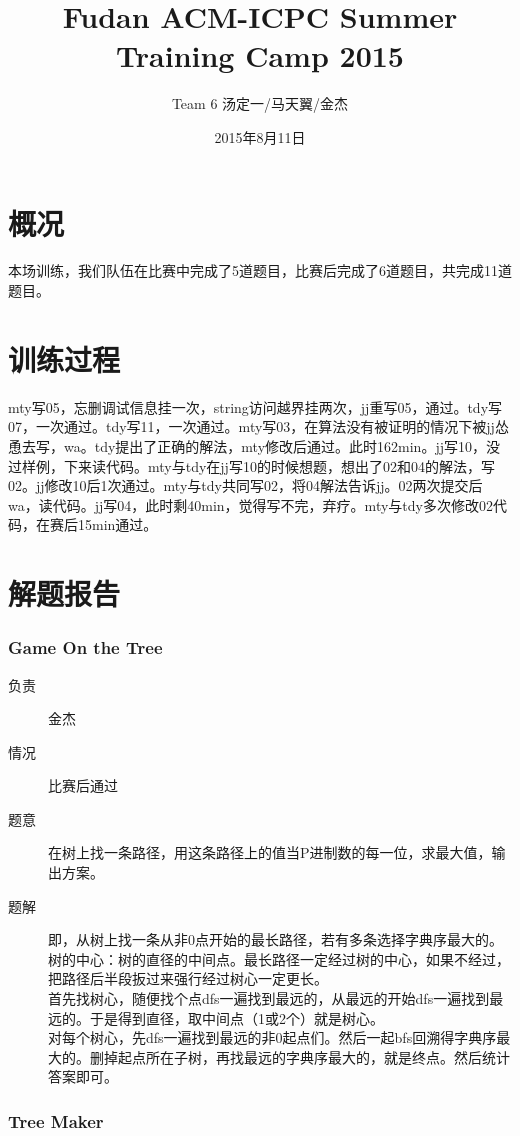 \documentclass[a4paper, 11pt, nofonts, nocap, fancyhdr]{ctexart}
\title{Fudan ACM-ICPC Summer Training Camp 2015}
\author{Team 6 汤定一/马天翼/金杰}
\date{2015年8月11日}
\newcommand{\problem}[1]{\subsubsection{#1}}
\begin{document}
\maketitle

\section{概况}

本场训练，我们队伍在比赛中完成了5道题目，比赛后完成了6道题目，共完成11道题目。

\section{训练过程}

mty写05，忘删调试信息挂一次，string访问越界挂两次，jj重写05，通过。tdy写07，一次通过。tdy写11，一次通过。mty写03，在算法没有被证明的情况下被jj怂恿去写，wa。tdy提出了正确的解法，mty修改后通过。此时162min。jj写10，没过样例，下来读代码。mty与tdy在jj写10的时候想题，想出了02和04的解法，写02。jj修改10后1次通过。mty与tdy共同写02，将04解法告诉jj。02两次提交后wa，读代码。jj写04，此时剩40min，觉得写不完，弃疗。mty与tdy多次修改02代码，在赛后15min通过。

\section{解题报告}

\problem{Game On the Tree}

\begin{description}
\item[负责] 金杰
\item[情况] 比赛后通过
\item[题意]
在树上找一条路径，用这条路径上的值当P进制数的每一位，求最大值，输出方案。
\item[题解]
即，从树上找一条从非0点开始的最长路径，若有多条选择字典序最大的。\\
树的中心：树的直径的中间点。最长路径一定经过树的中心，如果不经过，把路径后半段扳过来强行经过树心一定更长。\\
首先找树心，随便找个点dfs一遍找到最远的，从最远的开始dfs一遍找到最远的。于是得到直径，取中间点（1或2个）就是树心。\\
对每个树心，先dfs一遍找到最远的非0起点们。然后一起bfs回溯得字典序最大的。删掉起点所在子树，再找最远的字典序最大的，就是终点。然后统计答案即可。

\end{description}

\problem{Tree Maker}
\end{document}
